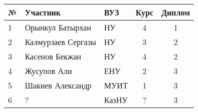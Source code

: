 \begin{center}
\begin{tabular}{|l|l|l|c|c|}
\hline
№ & Участник & ВУЗ & Курс & Диплом \\
\hline
1 & Орынкул Батырхан & НУ & 4 & 1 \\
\hline
2 & Калмурзаев Сергазы & НУ & 3 & 2 \\
\hline
3 & Касенов Бекжан & НУ & 4 & 2 \\
\hline
4 & Жусупов Али & ЕНУ & 2 & 3 \\
\hline
5 & Шакиев Александр & МУИТ & 1 & 3 \\
\hline
6 & ? & КазНУ & ? & 3 \\
\hline
\end{tabular}
\end{center}
